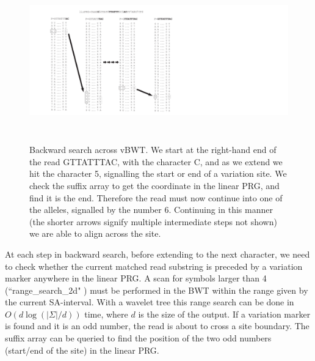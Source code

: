 \documentclass[runningheads,a4paper]{llncs}
\begin{document}
\begin{figure}
\centering
\includegraphics[height=7cm]{BWT.pdf}
\caption{Backward search across vBWT.  We start at the right-hand end of the read GTTATTTAC, with the character C, and as we extend we hit the character 5, signalling the start or end of a variation site. We check the suffix array to get the coordinate in the linear PRG, and find it is the end. Therefore the read must now continue into one of the alleles, signalled by the number 6. Continuing in this manner (the shorter arrows signify multiple intermediate steps not shown) we are able to align across the site.}
\label{fig:example}
\end{figure}

At each step in backward search, before extending to the next character, we need to check whether the current matched read substring is preceded by a variation marker anywhere in the linear PRG. A scan for symbols larger than 4 (``range\_search\_2d" ) must be performed in the BWT within the range given by the current SA-interval. With a wavelet tree this range search can be done in $O(d\log(|\Sigma|/d))$ time, where $d$ is the size of the output. If a variation marker is found and it is an odd number, the read is about to cross a site boundary. The suffix array can be queried to find the position of the two odd numbers (start/end of the site) in the linear PRG.
\end{document}
